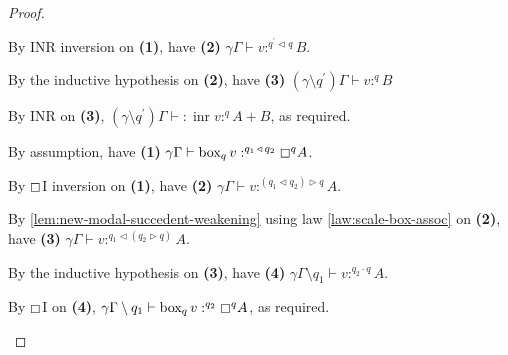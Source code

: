 \documentclass[acmsmall,screen,nonacm]{acmart}
\DeclareMathOperator{\bbox}{\text{box}}
\DeclareMathOperator{\inr}{\text{inr}}
\newcommand{\tee}{\vdash}
\DeclareMathOperator{\scale}{\mathbin{\triangleleft}}
\DeclareMathOperator{\boxop}{\mathbin{\triangleright}}
\begin{document}
\begin{proof}
\begin{description}
    By INR inversion on \textbf{(1)}, have \textbf{(2)} $\gamma\Gamma \tee v :^{q^\prime \scale q} B$.

    By the inductive hypothesis on \textbf{(2)}, have \textbf{(3)} $(\gamma \setminus q^\prime)\Gamma \tee v :^q B$

    By INR on \textbf{(3)}, $(\gamma \setminus q^\prime)\Gamma \tee : \inr v :^q A + B$, as required.
    \\
    \item[Case $\boxempty$I.]
    By assumption, have \textbf{(1)} $\gamma\Gamma \tee \bbox_q v :^{q_1 \scale q_2} \boxempty^q A$.

    By $\boxempty$I inversion on \textbf{(1)}, have \textbf{(2)} $\gamma\Gamma \tee v :^{(q_1 \scale q_2) \boxop q} A$.

    By \ref{lem:new-modal-succedent-weakening} using law \ref{law:scale-box-assoc} on \textbf{(2)}, have \textbf{(3)} $\gamma\Gamma \tee v :^{q_1 \scale (q_2 \boxop q)} A$.

    By the inductive hypothesis on \textbf{(3)}, have \textbf{(4)} $\gamma\Gamma \setminus q_1 \tee v :^{q_2 \cdot q} A$.

    By $\boxempty$I on \textbf{(4)}, $\gamma\Gamma \setminus q_1 \tee \bbox_q v :^{q_2} \boxempty^q A$, as required.
  \end{description}
\end{proof}





\end{document}
